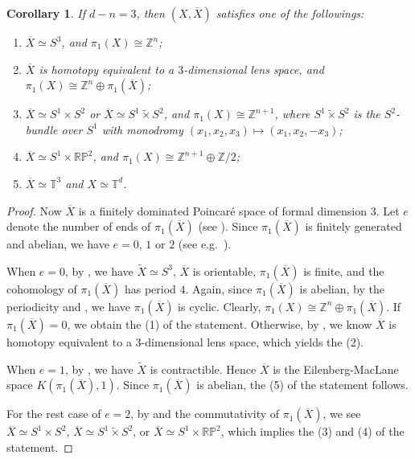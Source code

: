\documentclass[12pt]{amsart}
\theoremstyle{plain}
\newtheorem{corollary}[theorem]{Corollary}
\theoremstyle{definition}
\theoremstyle{question}
\theoremstyle{remark}
\theoremstyle{assumption}
\numberwithin{equation}{section}
\theoremstyle{bigthm}
\begin{document}
\begin{corollary}\label{cor_Poincare-3}
If $d-n=3$, then $(X, \overline{X})$ satisfies one of the followings:
\begin{enumerate}
\item $\overline{X} \simeq S^{3}$, and $\pi_{1} (X) \cong \mathbb{Z}^{n}$;

\item $\overline{X}$ is homotopy equivalent to a $3$-dimensional lens space, and $\pi_{1} (X) \cong \mathbb{Z}^{n} \oplus \pi_{1} (\overline{X})$;

\item $\overline{X} \simeq S^{1} \times S^{2}$ or $\overline{X} \simeq S^{1} \tilde{\times} S^{2}$, and $\pi_{1} (X) \cong \mathbb{Z}^{n+1}$, where $S^{1} \tilde{\times} S^{2}$ is the $S^{2}$-bundle over $S^{1}$ with monodromy $(x_{1}, x_{2}, x_{3}) \mapsto (x_{1}, x_{2}, -x_{3})$;

\item $\overline{X} \simeq S^{1} \times \mathbb{RP}^{2}$, and $\pi_{1} (X) \cong \mathbb{Z}^{n+1} \oplus \mathbb{Z}/2$;

\item $\overline{X} \simeq \mathbb{T}^{3}$ and $X \simeq \mathbb{T}^{d}$.
\end{enumerate}
\end{corollary}
\begin{proof}
Now $\overline{X}$ is a finitely dominated Poincar\'{e} space of formal dimension $3$. Let $e$ denote the number of ends of $\pi_{1} (\overline{X})$ (see \cite[p.~231]{Wall67}). Since $\pi_{1} (\overline{X})$ is finitely generated and abelian, we have $e=0$, $1$ or $2$ (see e.g.~\cite[$\S$8.2]{Loh}).

When $e=0$, by \cite[Theorem~4.3~and~p.~235]{Wall67}, we have $\widetilde{X} \simeq S^{3}$, $\overline{X}$ is orientable, $\pi_{1} (\overline{X})$ is finite, and the cohomology of $\pi_{1} (\overline{X})$ has period $4$. Again, since $\pi_{1} (\overline{X})$ is abelian, by the periodicity and \cite[p.~262,~Theorem~11.6]{Cartan_Eilenberg}, we have $\pi_{1} (\overline{X})$ is cyclic. Clearly, $\pi_{1} (X) \cong \mathbb{Z}^{n} \oplus \pi_{1} (\overline{X})$. If $\pi_{1} (\overline{X}) = 0$, we obtain the (1) of the statement. Otherwise, by \cite[p.~94]{Thomas}, we know $\overline{X}$ is homotopy equivalent to a $3$-dimensional lens space, which yields the (2).

When $e=1$, by \cite[p.~235]{Wall67}, we have $\widetilde{X}$ is contractible. Hence $\overline{X}$ is the Eilenberg-MacLane space $K(\pi_{1} (\overline{X}), 1)$. Since $\pi_{1} (\overline{X})$ is abelian, the (5) of the statement follows.

For the rest case of $e=2$, by \cite[Theorem~4.4]{Wall67} and the commutativity of $\pi_{1} (\overline{X})$, we see $\overline{X} \simeq S^{1} \times S^{2}$, $\overline{X} \simeq S^{1} \tilde{\times} S^{2}$, or $\overline{X} \simeq S^{1} \times \mathbb{RP}^{2}$, which implies the (3) and (4) of the statement.
\end{proof}
\end{document}
